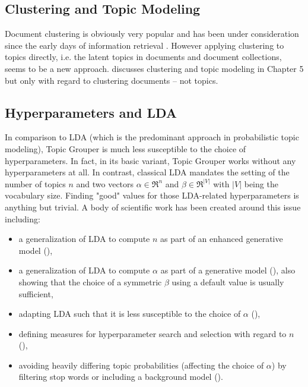 \documentclass[10pt, a4paper, oneside]{article}
\begin{document}
\subsection{Clustering and Topic Modeling}

Document clustering is obviously very popular and has been under consideration since the early days of information retrieval \cite{Salton:1975:VSM:361219.361220}. However applying clustering to topics directly, i.e. the latent topics in documents and document collections, seems to be a new approach.
\cite{wallach08} discusses clustering and topic modeling in Chapter 5 but only with regard to clustering documents -- not topics.

\subsection{Hyperparameters and LDA}

In comparison to LDA (which is the predominant approach in probabilistic topic modeling), Topic Grouper is much less susceptible to the choice of hyperparameters. In fact, in its basic variant, Topic Grouper works without any hyperparameters at all. In contrast, classical LDA mandates the setting of the number of topics $n$ and two vectors $\alpha \in \Re^n$ and $\beta \in \Re^{|V|}$ with $|V|$ being the vocabulary size. Finding "good" values for those LDA-related hyperparameters is anything but trivial. A body of scientific work has been created around this issue including:
\begin{itemize}
\item a generalization of LDA to compute $n$ as part of an enhanced generative model (\cite{Teh04hierarchicaldirichlet}),
\item a generalization of LDA to compute $\alpha$ as part of a generative model (\cite{conf/nips/WallachMM09}), also showing that the choice of a symmetric $\beta$ using a default value is usually sufficient,
\item adapting LDA such that it is less susceptible to the choice of $\alpha$ (\cite{Tan_topic-weak-correlatedlatent}),
\item defining measures for hyperparameter search and selection with regard to $n$ (\cite{Arun2010}),
\item avoiding heavily differing topic probabilities (affecting the choice of $\alpha$) by filtering stop words or including a background model (\cite{conf/nips/ChemuduguntaSS06}).
\end{itemize}
\end{document}
